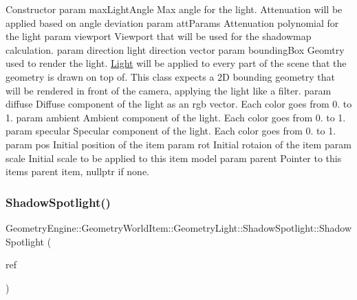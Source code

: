 Constructor param max\+Light\+Angle Max angle for the light. Attenuation will be applied based on angle deviation param att\+Params Attenuation polynomial for the light param viewport Viewport that will be used for the shadowmap calculation. param direction light direction vector param bounding\+Box Geomtry used to render the light. \mbox{\hyperlink{class_geometry_engine_1_1_geometry_world_item_1_1_geometry_light_1_1_light}{Light}} will be applied to every part of the scene that the geometry is drawn on top of. This class expects a 2D bounding geometry that will be rendered in front of the camera, applying the light like a filter. param diffuse Diffuse component of the light as an rgb vector. Each color goes from 0. to 1. param ambient Ambient component of the light. Each color goes from 0. to 1. param specular Specular component of the light. Each color goes from 0. to 1. param pos Initial position of the item param rot Initial rotaion of the item param scale Initial scale to be applied to this item model param parent Pointer to this items parent item, nullptr if none. \mbox{\label{class_geometry_engine_1_1_geometry_world_item_1_1_geometry_light_1_1_shadow_spotlight_a8757a401616b581827158f64eb176964}} 
\subsubsection{\texorpdfstring{ShadowSpotlight()}{ShadowSpotlight()}\hspace{0.1cm}{\footnotesize\ttfamily [2/2]}}
{\footnotesize\ttfamily Geometry\+Engine\+::\+Geometry\+World\+Item\+::\+Geometry\+Light\+::\+Shadow\+Spotlight\+::\+Shadow\+Spotlight (\begin{DoxyParamCaption}\item[{const \mbox{\hyperlink{class_geometry_engine_1_1_geometry_world_item_1_1_geometry_light_1_1_shadow_spotlight}{Shadow\+Spotlight}} \&}]{ref }\end{DoxyParamCaption})\hspace{0.3cm}{\ttfamily [inline]}}

